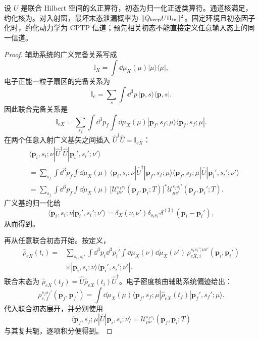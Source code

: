 \begin{theorem}
设 $U$ 是联合 Hilbert 空间的幺正算符，初态为归一化正迹类算符。通道核满足，约化核为。对入射窗，最坏末态泄漏概率为 $\|Q_{\rm keep}U\Pi_{\rm in}\|^2$。固定环境且初态因子化时，约化动力学为 CPTP 信道；预先相关初态不能直接定义任意输入态上的同一信道。
\end{theorem}
\begin{proof}
辅助系统的广义完备关系写成
\[
\mathbb I_X=\int\dd\mu_X(\mu)|\mu\rangle\langle\mu|,
\]
电子正能一粒子扇区的完备关系为
\[
\mathbb I_e=\sum_s\int\dd^3p\,|\mathbf p,s\rangle\langle\mathbf p,s|.
\]
因此联合完备关系是
\[
\mathbb I_{eX}
=\sum_{s_f}\int\dd^3p_f\int\dd\mu_X(\mu)
|\mathbf p_f,s_f;\mu\rangle
\langle\mathbf p_f,s_f;\mu|.
\]
在两个任意入射广义基矢之间插入
$\hat U^\dagger\hat U=\mathbb I_{eX}$：
\begin{align*}
&\langle\mathbf p_i,s_i;\nu|\hat U^\dagger\hat U
|\mathbf p_i',s_i';\nu'\rangle\\
&=\sum_{s_f}\int\dd^3p_f\int\dd\mu_X(\mu)\,
\langle\mathbf p_i,s_i;\nu|\hat U^\dagger
|\mathbf p_f,s_f;\mu\rangle
\langle\mathbf p_f,s_f;\mu|\hat U
|\mathbf p_i',s_i';\nu'\rangle\\
&=\sum_{s_f}\int\dd^3p_f\int\dd\mu_X(\mu)\,
\bigl[\mathscr U_{\mu\nu}^{s_f s_i}
(\mathbf p_f,\mathbf p_i;T)\bigr]^*
\mathscr U_{\mu\nu'}^{s_f s_i'}
(\mathbf p_f,\mathbf p_i';T).
\end{align*}
广义基的归一化给
\[
\langle\mathbf p_i,s_i;\nu|\mathbf p_i',s_i';\nu'\rangle
=\delta_X(\nu,\nu')\delta_{s_i s_i'}
\delta^{(3)}(\mathbf p_i-\mathbf p_i'),
\]
从而得到。

再从任意联合初态开始。按定义，
\begin{align*}
\hat\rho_{eX}(t_i)
={}&\sum_{s_i,s_i'}
\int\dd^3p_i\dd^3p_i'
\int\dd\mu_X(\nu)\dd\mu_X(\nu')\,
\rho_{eX,i}^{s_i s_i';\nu\nu'}(\mathbf p_i,\mathbf p_i')\\
&\times
|\mathbf p_i,s_i;\nu\rangle
\langle\mathbf p_i',s_i';\nu'|.
\end{align*}
联合末态为
$\hat\rho_{eX}(t_f)=\hat U\hat\rho_{eX}(t_i)\hat U^\dagger$。电子密度核由辅助系统偏迹给出：
\[
\rho_{e,f}^{s_f s_f'}(\mathbf p_f,\mathbf p_f')
=\int\dd\mu_X(\mu)
\langle\mathbf p_f,s_f;\mu|\hat\rho_{eX}(t_f)
|\mathbf p_f',s_f';\mu\rangle .
\]
代入联合初态展开，并分别使用
\[
\langle\mathbf p_f,s_f;\mu|\hat U
|\mathbf p_i,s_i;\nu\rangle
=\mathscr U_{\mu\nu}^{s_f s_i}(\mathbf p_f,\mathbf p_i;T)
\]
与其复共轭，逐项积分便得到。


\end{proof}

